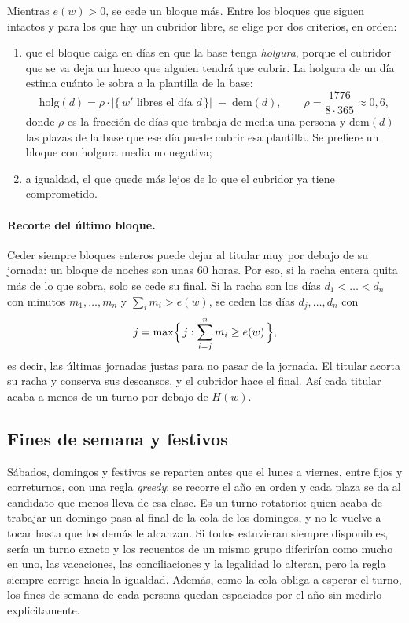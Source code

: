 \documentclass[11pt,a4paper]{article}
\begin{document}
Mientras $e(w) > 0$, se cede un bloque más. Entre los bloques que siguen intactos y para los que
hay un cubridor libre, se elige por dos criterios, en orden:
\begin{enumerate}[nosep]
  \item que el bloque caiga en días en que la base tenga \emph{holgura}, porque el cubridor que
        se va deja un hueco que alguien tendrá que cubrir. La holgura de un día estima cuánto
        le sobra a la plantilla de la base:
        \[
          \mathrm{holg}(d) = \rho \cdot \bigl|\{\, w' \text{ libres el día } d \,\}\bigr|
                             \;-\; \mathrm{dem}(d),
          \qquad \rho = \frac{1776}{8 \cdot 365} \approx 0{,}6,
        \]
        donde $\rho$ es la fracción de días que trabaja de media una persona y
        $\mathrm{dem}(d)$ las plazas de la base que ese día puede cubrir esa plantilla. Se prefiere
        un bloque con holgura media no negativa;
  \item a igualdad, el que quede más lejos de lo que el cubridor ya tiene comprometido.
\end{enumerate}

\paragraph{Recorte del último bloque.} Ceder siempre bloques enteros puede dejar al titular muy
por debajo de su jornada: un bloque de noches son unas 60 horas. Por eso, si la racha entera
quita más de lo que sobra, solo se cede su final. Si la racha son los días $d_1 < \dots < d_n$
con minutos $m_1, \dots, m_n$ y $\sum_i m_i > e(w)$, se ceden los días $d_j, \dots, d_n$ con
\[
  j = \max\Bigl\{\, j : \sum_{i=j}^{n} m_i \ge e(w) \,\Bigr\},
\]
es decir, las últimas jornadas justas para no pasar de la jornada. El titular acorta su racha y
conserva sus descansos, y el cubridor hace el final. Así cada titular acaba a menos de un turno
por debajo de $H(w)$.

\subsection{Fines de semana y festivos}

Sábados, domingos y festivos se reparten antes que el lunes a viernes, entre fijos y
correturnos, con una regla \emph{greedy}: se recorre el año en orden y cada plaza se da al
candidato que menos lleva de esa clase. Es un turno rotatorio: quien acaba de trabajar un
domingo pasa al final de la cola de los domingos, y no le vuelve a tocar hasta que los demás le
alcanzan. Si todos estuvieran siempre disponibles, sería un turno exacto y los recuentos de un
mismo grupo diferirían como mucho en uno, las vacaciones, las conciliaciones y la legalidad lo
alteran, pero la regla siempre corrige hacia la igualdad. Además, como la cola obliga a esperar
el turno, los fines de semana de cada persona quedan espaciados por el año sin medirlo
explícitamente.
\end{document}
